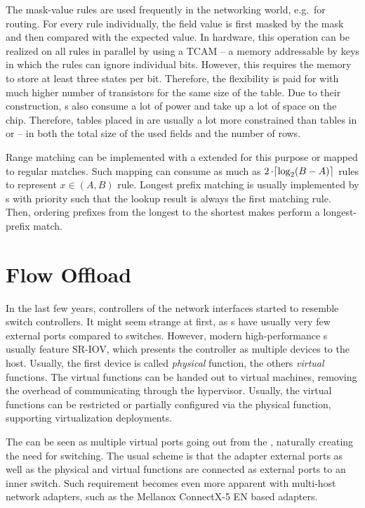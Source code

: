 The mask-value rules are used frequently in the networking world, e.g.\ for routing. For every rule
individually, the field value is first masked by the mask and then compared
with the expected value. In hardware, this operation can be realized on all
rules in parallel by using a \acrfull{TCAM} -- a memory addressable by keys in which
the rules can ignore individual bits. However, this requires the memory to store at
least three states per bit. Therefore, the flexibility is paid for with
much higher number of transistors for the same size of the table. Due to their
construction, s also consume a lot of power and take up a lot of space
on the chip. Therefore, tables placed in  are usually a lot more
constrained than tables in  or  -- in both the total size of the
used fields and the number of rows.

Range matching can be implemented with a  extended for this purpose
or mapped to regular  matches. Such mapping can consume as much as $2
\mathop{\cdot} \lceil \log_2 (B - A) \rceil$  rules to represent $x \in (A,
B)$ rule. Longest prefix matching is usually implemented by s with
priority such that the lookup result is always the first matching rule. Then,
ordering prefixes from the longest to the shortest makes  perform
a longest-prefix match.

\section{Flow Offload}
\label{offload:flow}

In the last few years, controllers of the network interfaces started to resemble
switch controllers. It might seem strange at first, as s have usually
very few external ports compared to switches. However, modern high-performance
s usually feature \acrfull{SR-IOV}, which presents the controller as
multiple  devices to the host. Usually, the first device is called
\emph{physical} function, the others \emph{virtual} functions. The virtual
functions can be handed out to virtual machines, removing the overhead of
communicating through the hypervisor. Usually, the virtual functions can be
restricted or partially configured via the physical function, supporting
virtualization deployments.

The  can be seen as multiple virtual
ports going out from the , naturally creating the need for switching.
The usual scheme is that the adapter external ports as well as the physical and
virtual functions are connected as external ports to an inner switch. Such
requirement becomes even more apparent with multi-host network adapters, such
as the Mellanox ConnectX-5 EN \cite{mlx5-pb} based adapters.

